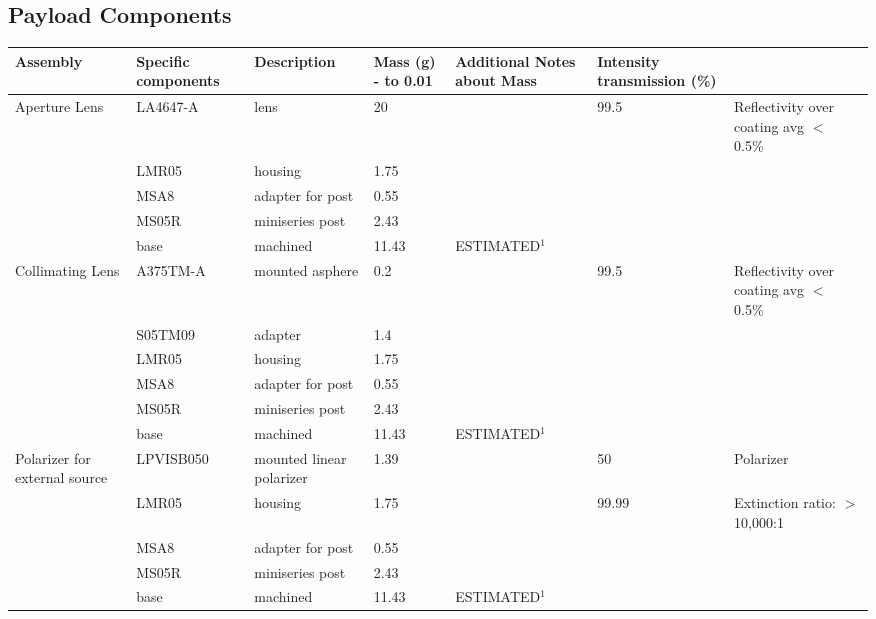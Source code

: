 \documentclass[12pt]{article}
\begin{document}
\begin{landscape}
\section{Payload Components} \label{app:payload_components}
\small
\begin{center}
\begin{longtable}{| p{3.25cm} | p{2.2cm} | p{3cm} | p{1.75cm} | p{2.5cm} | p{1.55cm} | p{5cm} |}
\hline
    \textbf{Assembly} & \textbf{Specific components} & \textbf{Description} & \textbf{Mass (g) - to 0.01} & \textbf{Additional Notes about Mass} & \textbf{Intensity transmission (\%)} &  \\ \hline 
    \midrule 
    \multirow{5}{*}{\parbox{3.25cm}{Aperture Lens}} & LA4647-A & lens  & 20    &       & 99.5  & Reflectivity over coating avg $<$ 0.5\% \\ 
          & LMR05 & housing & 1.75  &       &       &  \\
          & MSA8  & adapter for post & 0.55  &       &       &  \\
          & MS05R & miniseries post & 2.43  &       &       &  \\
          & base  & machined & 11.43 & ESTIMATED$^1$ &       &  \\ \hline
    \multirow{6}{*}{\parbox{3.25cm}{Collimating Lens}} & A375TM-A & mounted asphere & 0.2   &       & 99.5  & Reflectivity over coating avg $<$ 0.5\% \\ 
          & S05TM09 & adapter & 1.4   &       &       &  \\
          & LMR05 & housing & 1.75  &       &       &  \\
          & MSA8  & adapter for post & 0.55  &       &       &  \\
          & MS05R & miniseries post & 2.43  &       &       &  \\
          & base  & machined & 11.43 & ESTIMATED$^1$&       &  \\ \hline
    \multirow{5}{*}{\parbox{3.25cm}{Polarizer for external source}} & LPVISB050 & mounted linear polarizer & 1.39  &       & 50    & Polarizer \\ 
          & LMR05 & housing & 1.75  &       & 99.99 & Extinction ratio: $>$ 10,000:1 \\
          & MSA8  & adapter for post & 0.55  &       &       &  \\
          & MS05R & miniseries post & 2.43  &       &       &  \\
          & base  & machined & 11.43 & ESTIMATED$^1$ &       &  \\ \hline

\end{longtable}
\end{center}
\end{landscape}
\end{document}
